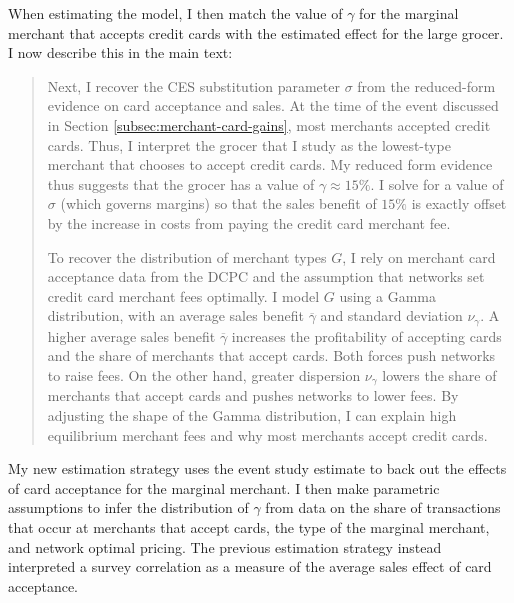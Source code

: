 \documentclass[main.tex]{subfiles}
\begin{document}
{When estimating the model, I then match the value of $\gamma$ for the marginal merchant that accepts credit cards with the estimated effect for the large grocer.
I now describe this in the main text:

\begin{quotation}
    Next, I recover the CES substitution parameter $\sigma$ from the reduced-form evidence on card acceptance and sales.
At the time of the event discussed in Section \ref{subsec:merchant-card-gains}, most merchants accepted credit cards.
Thus, I interpret the grocer that I study as the lowest-type merchant that chooses to accept credit cards.
My reduced form evidence thus suggests that the grocer has a value of $\gamma\approx15\%$.
I solve for a value of $\sigma$ (which governs margins) so that the sales benefit of $15\%$ is exactly offset by the increase in costs from paying the credit card merchant fee.

    To recover the distribution of merchant types $G$, I rely on merchant card acceptance data from the DCPC and the assumption that networks set credit card merchant fees optimally.
I model $G$ using a Gamma distribution, with an average sales benefit $\overline{\gamma}$ and standard deviation $\nu_\gamma$.
A higher average sales benefit $\overline{\gamma}$ increases the profitability of accepting cards and the share of merchants that accept cards.
Both forces push networks to raise fees.
On the other hand, greater dispersion $\nu_\gamma$ lowers the share of merchants that accept cards and pushes networks to lower fees.
By adjusting the shape of the Gamma distribution, I can explain high equilibrium merchant fees and why most merchants accept credit cards.
\end{quotation}

My new estimation strategy uses the event study estimate to back out the effects of card acceptance for the marginal merchant.
I then make parametric assumptions to infer the distribution of $\gamma$ from data on the share of transactions that occur at merchants that accept cards, the type of the marginal merchant, and network optimal pricing.
The previous estimation strategy instead interpreted a survey correlation as a measure of the average sales effect of card acceptance.
}
\end{document}

